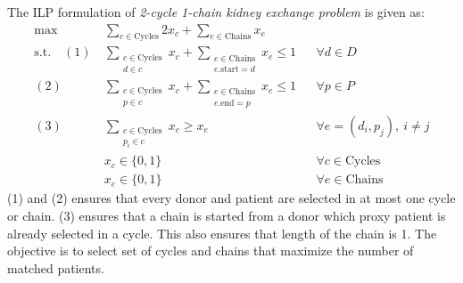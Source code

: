 The ILP formulation of \textit{2-cycle 1-chain kidney exchange problem} is given as:
\begin{align*}
\max\quad & \sum_{c \in \text{Cycles}} 2x_c + \sum_{e \in \text{Chains}} x_e \\
\text{s.t.}\quad 
 (1)\: & \sum_{\substack{c \in \text{Cycles} \\ d \in c}} x_c + \sum_{\substack{e \in \text{Chains} \\ e.\text{start} = d}} x_e \le 1 && \forall d \in D \\
(2)\: & \sum_{\substack{c \in \text{Cycles} \\ p \in c}} x_c + \sum_{\substack{e \in \text{Chains} \\ e.\text{end} = p}} x_e \le 1 && \forall p \in P \\
(3)\: & \sum_{\substack{c \in \text{Cycles} \\ p_i \in c}} x_c \ge x_e && \forall e = (d_i, p_j),\ i \ne j \\
& x_c \in \{0, 1\} && \forall c \in \text{Cycles} \\
& x_e \in \{0, 1\} && \forall e \in \text{Chains}
\end{align*}
\noindent
(1) and (2) ensures that every donor and patient are selected in at most one cycle or chain.
(3) ensures that a chain is started from a donor which proxy patient is already selected in a cycle. This also ensures that length of the chain is 1. The objective is to select set of cycles and chains that maximize the number of matched patients.

